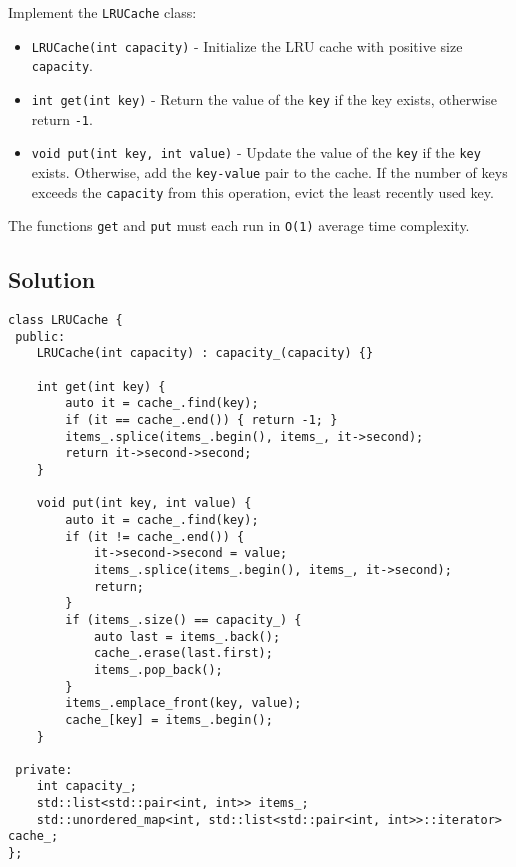 Implement the {\colorbox{CodeBackground}{\lstinline|LRUCache|}} class:
\begin{itemize}
	\item {\colorbox{CodeBackground}{\lstinline|LRUCache(int capacity)|}} - Initialize the LRU cache with positive size {\colorbox{CodeBackground}{\lstinline|capacity|}}.
	\item {\colorbox{CodeBackground}{\lstinline|int get(int key)|}} -  Return the value of the {\colorbox{CodeBackground}{\lstinline|key|}} if the key exists, otherwise return {\colorbox{CodeBackground}{\lstinline|-1|}}.
	\item {\colorbox{CodeBackground}{\lstinline|void put(int key, int value)|}} - Update the value of the {\colorbox{CodeBackground}{\lstinline|key|}} if the {\colorbox{CodeBackground}{\lstinline|key|}} exists. Otherwise, add the {\colorbox{CodeBackground}{\lstinline|key-value|}} pair to the cache. If the number of keys exceeds the {\colorbox{CodeBackground}{\lstinline|capacity|}} from this operation, evict the least recently used key.
\end{itemize}

The functions {\colorbox{CodeBackground}{\lstinline|get|}} and {\colorbox{CodeBackground}{\lstinline|put|}} must each run in {\colorbox{CodeBackground}{\lstinline|O(1)|}} average time complexity.

\subsection*{Solution}
\begin{lstlisting}
class LRUCache {
 public:
	LRUCache(int capacity) : capacity_(capacity) {}
	
	int get(int key) {
		auto it = cache_.find(key);
		if (it == cache_.end()) { return -1; }
		items_.splice(items_.begin(), items_, it->second);
		return it->second->second;
	}
	
	void put(int key, int value) {
		auto it = cache_.find(key);
		if (it != cache_.end()) {
			it->second->second = value;
			items_.splice(items_.begin(), items_, it->second);
			return;
		}
		if (items_.size() == capacity_) {
			auto last = items_.back();
			cache_.erase(last.first);
			items_.pop_back();
		}
		items_.emplace_front(key, value);
		cache_[key] = items_.begin();
	}
	
 private:
	int capacity_;
	std::list<std::pair<int, int>> items_;
	std::unordered_map<int, std::list<std::pair<int, int>>::iterator> cache_;
};
\end{lstlisting}